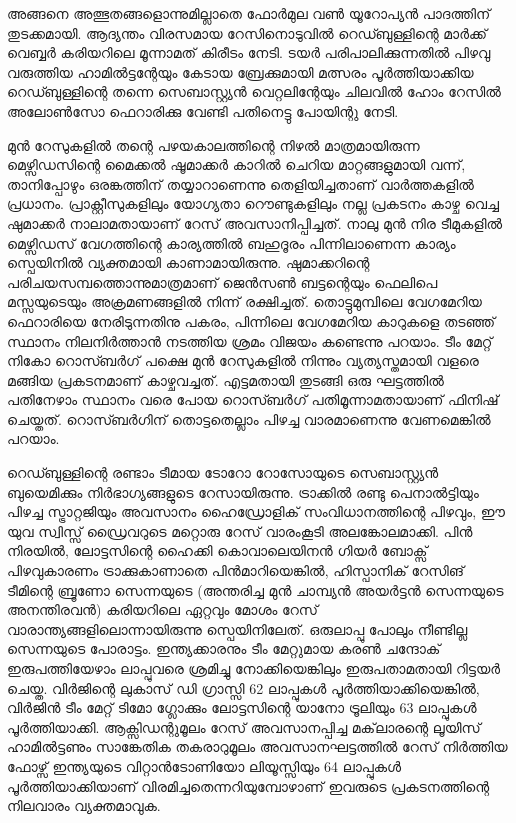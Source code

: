 \vskip 2pt

അങ്ങനെ അത്ഭുതങ്ങളൊന്നുമില്ലാതെ ഫോര്‍മുല വണ്‍ യൂറോപ്യന്‍ പാദത്തിന് തുടക്കമായി. ആദ്യന്തം 
വിരസമായ റേസിനൊടുവില്‍ റെഡ്ബുള്ളിന്റെ മാര്‍ക്ക് വെബ്ബര്‍ കരിയറിലെ മൂന്നാമത് കിരീടം നേടി. 
ടയര്‍ പരിപാലിക്കുന്നതില്‍ പിഴവു വരുത്തിയ ഹാമില്‍ട്ടന്റേയും കേടായ ബ്രേക്കുമായി മത്സരം 
പൂര്‍ത്തിയാക്കിയ റെഡ്ബുള്ളിന്റെ തന്നെ സെബാസ്റ്റ്യന്‍ വെറ്റലിന്റേയും ചിലവില്‍ ഹോം റേസില്‍ 
അലോണ്‍സോ ഫെറാരിക്കു വേണ്ടി പതിനെട്ടു പോയിന്റു നേടി.

മുന്‍ റേസുകളില്‍ തന്റെ പഴയകാലത്തിന്റെ നിഴല്‍ മാത്രമായിരുന്ന മെഴ്സിഡസിന്റെ മൈക്കല്‍ ഷൂമാക്കര്‍ 
കാറില്‍ ചെറിയ മാറ്റങ്ങളുമായി വന്ന്, താനിപ്പോഴും ഒരങ്കത്തിന് തയ്യാറാണെന്നു തെളിയിച്ചതാണ് 
വാര്‍ത്തകളില്‍ പ്രധാനം. പ്രാക്റ്റീസുകളിലും യോഗ്യതാ റൌണ്ടുകളിലും നല്ല പ്രകടനം കാഴ്ച വെച്ച ഷുമാക്കര്‍ 
നാലാമതായാണ് റേസ് അവസാനിപ്പിച്ചത്. നാലു മുന്‍ നിര ടീമുകളില്‍ മെഴ്സിഡസ് വേഗത്തിന്റെ കാര്യത്തില്‍ 
ബഹുദൂരം പിന്നിലാണെന്ന കാര്യം സ്പെയിനില്‍ വ്യക്തമായി കാണാമായിരുന്നു. ഷുമാക്കറിന്റെ 
പരിചയസമ്പത്തൊന്നുമാത്രമാണ് ജെന്‍സണ്‍ ബട്ടന്റെയും ഫെലിപെ മസ്സയുടെയും അക്രമണങ്ങളില്‍ നിന്ന് 
രക്ഷിച്ചത്. തൊട്ടുമുമ്പിലെ വേഗമേറിയ ഫെറാരിയെ നേരിടുന്നതിനു പകരം, പിന്നിലെ വേഗമേറിയ കാറുകളെ 
തടഞ്ഞ് സ്ഥാനം നിലനിര്‍ത്താന്‍ നടത്തിയ ശ്രമം വിജയം കണ്ടെന്നു പറയാം. ടീം മേറ്റ് നികോ റൊസ്ബര്‍ഗ് 
പക്ഷെ മുന്‍ റേസുകളില്‍ നിന്നും വ്യത്യസ്തമായി വളരെ മങ്ങിയ പ്രകടനമാണ് കാഴ്ചവച്ചത്. എട്ടമതായി തുടങ്ങി 
ഒരു ഘട്ടത്തില്‍ പതിനേഴാം സ്ഥാനം വരെ പോയ റൊസ്ബര്‍ഗ് പതിമൂന്നാമതായാണ് ഫിനിഷ് ചെയ്തത്. 
റൊസ്ബര്‍ഗിന് തൊട്ടതെല്ലാം പിഴച്ച വാരമാണെന്നു വേണമെങ്കില്‍ പറയാം.

റെഡ്ബുള്ളിന്റെ രണ്ടാം ടീമായ ടോറോ റോസോയുടെ സെബാസ്റ്റ്യന്‍ ബുയെമിക്കും നിര്‍ഭാഗ്യങ്ങളുടെ റേസായിരുന്നു. 
ട്രാക്കില്‍ രണ്ടു പെനാല്‍ട്ടിയും പിഴച്ച സ്ട്രാറ്റജിയും അവസാനം ഹൈഡ്രോളിക് സംവിധാനത്തിന്റെ പിഴവും, ഈ യുവ 
സ്വിസ്സ് ഡ്രൈവറുടെ മറ്റൊരു റേസ് വാരംകൂടി അലങ്കോലമാക്കി. പിന്‍ നിരയില്‍, ലോട്ടസിന്റെ ഹൈക്കി 
കൊവാലെയിനന്‍ ഗിയര്‍ ബോക്സ് പിഴവുകാരണം ട്രാക്കുകാണാതെ പിന്‍മാറിയെങ്കില്‍, ഹിസ്പാനിക് റേസിങ് ടീമിന്റെ 
ബ്രൂണോ സെന്നയുടെ (അന്തരിച്ച മുന്‍ ചാമ്പ്യന്‍ അയര്‍ട്ടന്‍ സെന്നയുടെ അനന്തിരവന്‍) കരിയറിലെ ഏറ്റവും മോശം 
റേസ് വാരാന്ത്യങ്ങളിലൊന്നായിരുന്നു സ്പെയിനിലേത്. ഒരുലാപ്പു പോലും നീണ്ടില്ല സെന്നയുടെ പോരാട്ടം. ഇന്ത്യക്കാരനും 
ടീം മേറ്റുമായ കരണ്‍ ചന്ദോക് ഇരുപത്തിയേഴാം ലാപ്പുവരെ ശ്രമിച്ചു നോക്കിയെങ്കിലും ഇരുപതാമതായി റിട്ടയര്‍ ചെയ്ത. 
വിര്‍ജിന്റെ ലുകാസ് ഡി ഗ്രാസ്സി 62 ലാപ്പുകള്‍ പൂര്‍ത്തിയാക്കിയെങ്കില്‍, വിര്‍ജിന്‍ ടീം മേറ്റ് ടിമോ ഗ്ലോക്കും ലോട്ടസിന്റെ 
യാനോ ട്രൂലിയും 63 ലാപ്പുകള്‍ പൂര്‍ത്തിയാക്കി. ആക്സിഡന്റുമൂലം റേസ് അവസാനപ്പിച്ച മക്‌ലാരന്റെ ലൂയിസ് 
ഹാമില്‍ട്ടണും സാങ്കേതിക തകരാറുമൂലം അവസാനഘട്ടത്തില്‍ റേസ് നിര്‍ത്തിയ ഫോഴ്സ് ഇന്ത്യയുടെ വിറ്റാന്‍ടോണിയോ 
ലിയൂസ്സിയും 64 ലാപ്പുകള്‍ പൂര്‍ത്തിയാക്കിയാണ് വിരമിച്ചതെന്നറിയുമ്പോഴാണ് ഇവരുടെ പ്രകടനത്തിന്റെ നിലവാരം 
വ്യക്തമാവുക.

